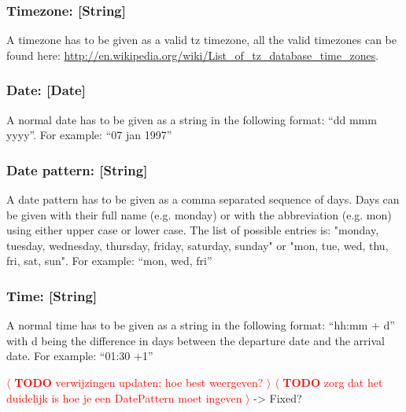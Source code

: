 \documentclass[a4paper,11pt]{article}
\newcommand{\todo}[1]{\textcolor{red}{\(\langle\) \textbf{TODO} #1 \(\rangle\) }}
\begin{document}
\subsubsection*{Timezone: [String]}
\label{Timezone}
A timezone has to be given as a valid tz timezone, all the valid timezones can be found here: \href{http://en.wikipedia.org/wiki/List_of_tz_database_time_zones}{ http://en.wikipedia.org/wiki/List\_of\_tz\_database\_time\_zones}.

\subsubsection*{Date: [Date]}
\label{Date}
A normal date has to be given as a string in the following format: “dd mmm yyyy”. \newline
	For example: “07 jan 1997”
	
\subsubsection*{Date pattern: [String]}
\label{Datepattern}
A date pattern has to be given as a comma separated sequence of days. Days can be given with their full name (e.g. monday) or with the abbreviation (e.g. mon) using either upper case or lower case. The list of possible entries is: "monday, tuesday, wednesday, thursday, friday, saturday, sunday" or "mon, tue, wed, thu, fri, sat, sun". \newline
For example: “mon, wed, fri”


\subsubsection*{Time: [String]}
\label{Time}
A normal time has to be given as a string in the following format: “hh:mm + d” with d being the difference in days between the departure date and the arrival date. \newline
For example: “01:30 +1”

\todo{verwijzingen updaten; hoe best weergeven?} \newline
\todo{zorg dat het duidelijk is hoe je een DatePattern moet ingeven} -> Fixed?
\end{document}

